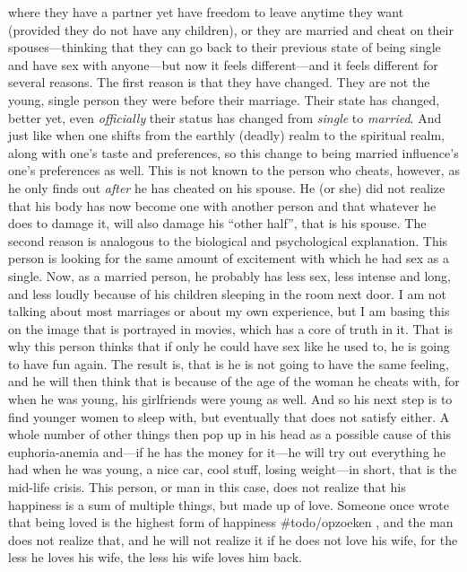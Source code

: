 where they have a partner yet have freedom to leave anytime they want
(provided they do not have any children), or they are married and cheat
on their spouses---thinking that they can go back to their previous
state of being single and have sex with anyone---but now it feels
different---and it feels different for several reasons. The first reason
is that they have changed. They are not the young, single person they
were before their marriage. Their state has changed, better yet, even
\emph{officially} their status has changed from \emph{single} to
\emph{married}. And just like when one shifts from the earthly (deadly)
realm to the spiritual realm, along with one's taste and preferences, so
this change to being married influence's one's preferences as well. This
is not known to the person who cheats, however, as he only finds out
\emph{after} he has cheated on his spouse. He (or she) did not realize
that his body has now become one with another person and that whatever
he does to damage it, will also damage his ``other half'', that is his
spouse. The second reason is analogous to the biological and
psychological explanation. This person is looking for the same amount of
excitement with which he had sex as a single. Now, as a married person,
he probably has less sex, less intense and long, and less loudly because
of his children sleeping in the room next door. I am not talking about
most marriages or about my own experience, but I am basing this on the
image that is portrayed in movies, which has a core of truth in it. That
is why this person thinks that if only he could have sex like he used
to, he is going to have fun again. The result is, that is he is not
going to have the same feeling, and he will then think that is because
of the age of the woman he cheats with, for when he was young, his
girlfriends were young as well. And so his next step is to find younger
women to sleep with, but eventually that does not satisfy either. A
whole number of other things then pop up in his head as a possible cause
of this euphoria-anemia and---if he has the money for it---he will try
out everything he had when he was young, a nice car, cool stuff, losing
weight---in short, that is the mid-life crisis. This person, or man in
this case, does not realize that his happiness is a sum of multiple
things, but made up of love. Someone once wrote that being loved is the
highest form of happiness \#todo/opzoeken , and the man does not realize
that, and he will not realize it if he does not love his wife, for the
less he loves his wife, the less his wife loves him back.

